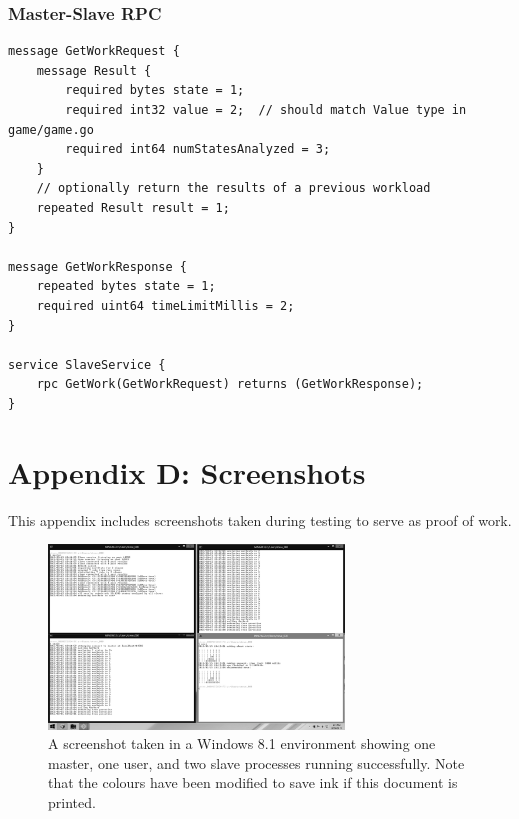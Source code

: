 \documentclass[pdftex,12pt,a4paper]{article}
\begin{document}
\subsubsection*{Master-Slave RPC}
\begin{lstlisting}
message GetWorkRequest {
    message Result {
        required bytes state = 1;
        required int32 value = 2;  // should match Value type in game/game.go
        required int64 numStatesAnalyzed = 3;
    }
    // optionally return the results of a previous workload
    repeated Result result = 1;
}

message GetWorkResponse {
    repeated bytes state = 1;
    required uint64 timeLimitMillis = 2;
}

service SlaveService {
    rpc GetWork(GetWorkRequest) returns (GetWorkResponse);
}
\end{lstlisting}

%
%
\pagebreak
\section{Appendix D: Screenshots}

This appendix includes screenshots taken during testing to serve as proof of work.

\begin{figure}[h]
\begin{center}
\includegraphics[width=0.7\textwidth]{img/win8}
\caption{A screenshot taken in a Windows 8.1 environment showing one master, one user, and two slave processes running successfully. Note that the colours have been modified to save ink if this document is printed.}
\label{fig:win8}
\end{center}
\end{figure}
\end{document}
